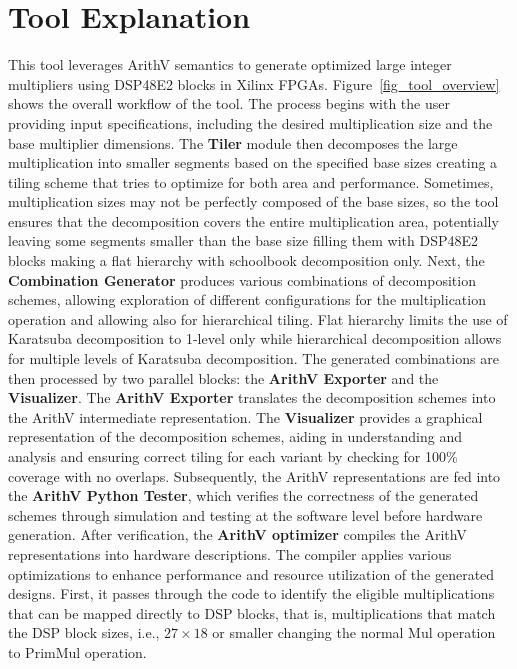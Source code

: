 \section{Tool Explanation}
This tool leverages ArithV semantics to generate optimized large integer multipliers using DSP48E2 blocks in Xilinx FPGAs. Figure~\ref{fig_tool_overview} shows the overall workflow of the tool.
The process begins with the user providing input specifications, including the desired multiplication size and the base multiplier dimensions.
The \textbf{Tiler} module then decomposes the large multiplication into smaller segments based on the specified base sizes creating a tiling scheme that tries to optimize for both area and performance.
Sometimes, multiplication sizes may not be perfectly composed of the base sizes, so the tool ensures that the decomposition covers the entire multiplication area, potentially leaving some segments smaller than the base size filling them with DSP48E2 blocks making  a flat hierarchy with schoolbook decomposition only.
Next, the \textbf{Combination Generator} produces various combinations of decomposition schemes, allowing exploration of different configurations for the multiplication operation and allowing also for hierarchical tiling.
Flat hierarchy limits the use of Karatsuba decomposition to 1-level only while hierarchical decomposition allows for multiple levels of Karatsuba decomposition.
The generated combinations are then processed by two parallel blocks: the \textbf{ArithV Exporter} and the \textbf{Visualizer}.
The  \textbf{ArithV Exporter} translates the decomposition schemes into the ArithV intermediate representation. 
The \textbf{Visualizer} provides a graphical representation of the decomposition schemes, aiding in understanding and analysis and ensuring correct tiling for each variant by checking for 100\% coverage with no overlaps.
Subsequently, the ArithV representations are fed into the \textbf{ArithV Python Tester}, which verifies the correctness of the generated schemes through simulation and testing at the software level before hardware generation.
After verification, the \textbf{ArithV optimizer} compiles the ArithV representations into hardware descriptions.
The compiler applies various optimizations to enhance performance and resource utilization of the generated designs.
First, it passes through the code to identify the eligible multiplications that can be mapped directly to DSP blocks, that is, multiplications that match the DSP block sizes, i.e., $27\times18$ or smaller changing the normal Mul operation to PrimMul operation.
